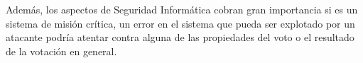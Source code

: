 Además, los aspectos de Seguridad Informática cobran gran importancia si es un sistema de misión crítica, un error en el sistema que pueda ser explotado por un atacante podría atentar contra alguna de las propiedades del voto o el resultado de la votación en general.

